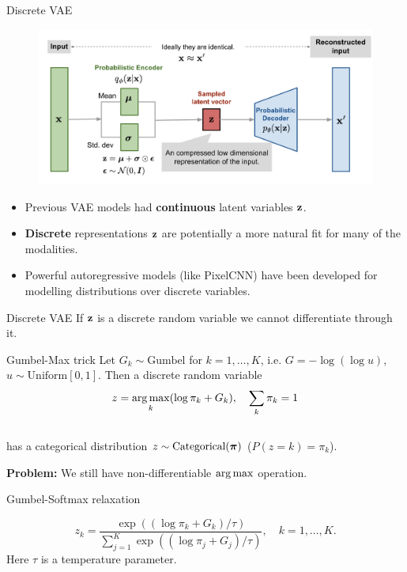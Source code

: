 \begin{frame}{Discrete VAE}
	\begin{figure}[h]
		\centering
		\includegraphics[width=\linewidth]{figs/vae-gaussian.png}
	\end{figure}
	\begin{itemize}
		\item Previous VAE models had \textbf{continuous} latent variables $\mathbf{z}$.
		\item \textbf{Discrete} representations $\mathbf{z}$ are potentially a more natural fit for many of the modalities.
		\item Powerful autoregressive models (like PixelCNN) have been developed for modelling distributions over discrete variables.
	\end{itemize}
\end{frame}
\begin{frame}{Discrete VAE}
	If $\mathbf{z}$ is a discrete random variable we cannot differentiate through it.
	
	\begin{block}{Gumbel-Max trick}
		Let $G_k \sim \text{Gumbel}$ for $k = 1, \dots, K$, i.e. $G = - \log (\log u)$, $u \sim \text{Uniform}[0, 1]$. Then a discrete random variable
		\vspace{-0.2cm}
		\[
			z = \operatorname*{arg\,max}_k (\log \pi_k + G_k), \quad \sum_k \pi_k = 1
		\]
		\vspace{-0.5cm} \\
		has a categorical distribution $z \sim \text{Categorical}(\boldsymbol{\pi})$ ($P(z = k) = \pi_k$).
	\end{block}
	\textbf{Problem:} We still have non-differentiable $\operatorname*{arg\,max}$ operation.
	\begin{block}{Gumbel-Softmax relaxation}
		
		\[
			z_k = \frac{\exp ((\log \pi_k + G_k) / \tau)}{\sum_{j=1}^K \exp ((\log \pi_j + G_j) / \tau)}, \quad k = 1, \dots, K.
		\]
		Here $\tau$ is a temperature parameter.
 	\end{block}
\end{frame}%

